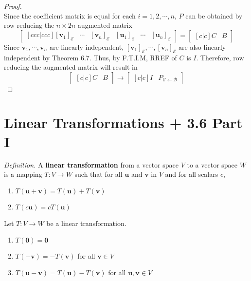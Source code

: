 \begin{proof}
\begin{equation*}
	\end{equation*}
	Since the coefficient matrix is equal for each $i = 1, 2, \cdots, n$, $P$ can be obtained by row reducing the $n \times 2n$ augmented matrix \begin{equation*}
		\begin{bmatrix}[ccc|ccc]
			\left[\textbf{v}_1\right]_\mathcal{E} & \cdots & \left[\textbf{v}_n\right]_\mathcal{E} & \left[\textbf{u}_1\right]_\mathcal{E} & \cdots & \left[\textbf{u}_n\right]_\mathcal{E}
		\end{bmatrix} = \begin{bmatrix}[c|c]
		C & B
		\end{bmatrix}
	\end{equation*}
	Since $\textbf{v}_1, \cdots, \textbf{v}_n$ are linearly independent, $\left[\textbf{v}_1\right]_\mathcal{E}, \cdots , \left[\textbf{v}_n\right]_\mathcal{E}$ are also linearly independent by Theorem 6.7. Thus, by F.T.I.M, RREF of $C$ is $I$. Therefore, row reducing the augmented matrix will result in \begin{equation*}
		\begin{bmatrix}[c|c]
		C & B
		\end{bmatrix} \rightarrow \begin{bmatrix}[c|c]
		I & P_{ \mathcal{C} \leftarrow \mathcal{B} }
		\end{bmatrix}
	\end{equation*}
\end{proof}

\section{Linear Transformations + 3.6 Part I}

\textit{Definition.} A \textbf{linear transformation} from a vector space $V$ to a vector space $W$ is a mapping $T: V \rightarrow W$ such that for all $\textbf{u}$ and $\textbf{v}$ in $V$ and for all scalars $c$, \begin{enumerate}
	\item $T(\textbf{u} + \textbf{v}) = T(\textbf{u}) + T(\textbf{v})$
	\item $T(c\textbf{u}) = cT(\textbf{u})$
\end{enumerate}

\begin{theorem}
	Let $T: V \rightarrow W$ be a linear transformation. \begin{enumerate}
		\item $T(\textbf{0}) = \textbf{0}$
		\item $T(-\textbf{v}) = -T(\textbf{v})$ for all $\textbf{v} \in V$
		\item $T(\textbf{u} - \textbf{v}) = T(\textbf{u}) - T(\textbf{v})$ for all $\textbf{u}, \textbf{v} \in V$
	\end{enumerate}
\end{theorem}

